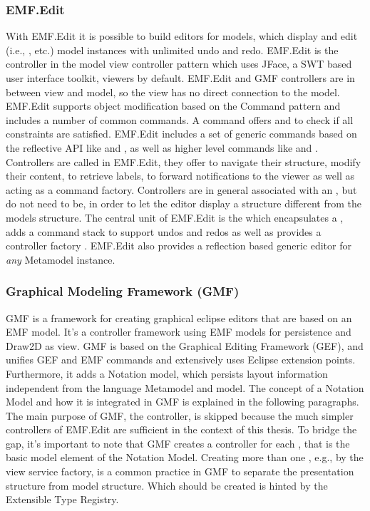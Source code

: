 \subsubsection{EMF.Edit}
With EMF.Edit it is possible to build editors for models, which display and edit (i.e., , etc.) model instances with unlimited undo and redo. EMF.Edit is the controller in the model view controller pattern which uses JFace, a SWT based user interface toolkit, viewers by default. EMF.Edit and GMF controllers are in between view and model, so the view has no direct connection to the model. EMF.Edit supports object modification based on the Command pattern \cite{patterns} and includes a number of common commands. A command offers  and  to check if all constraints are satisfied.  EMF.Edit includes a set of generic commands based on the reflective API like  and , as well as  higher level commands like  and . Controllers are called  in EMF.Edit, they offer to navigate their structure, modify their content, to retrieve labels, to forward notifications to the viewer as well as acting as a command factory. Controllers are in general associated with an , but do not need to be, in order to let the editor display a structure different from the models structure. The central unit of EMF.Edit is the  which encapsulates a , adds a command stack to support undos and redos as well as provides a controller factory \cite{EMF2nd}. EMF.Edit also provides a reflection based generic editor for \emph{any} Metamodel instance.  


\subsubsection {Graphical Modeling Framework (GMF)}
GMF is a framework for creating graphical eclipse editors that are based on an EMF model. It's a controller framework using EMF models for persistence and Draw2D as view. GMF is based on the Graphical Editing Framework (GEF), and unifies GEF and EMF commands and extensively uses Eclipse extension points. Furthermore, it adds a Notation model, which persists layout information independent from the language Metamodel and model. The concept of a Notation Model and how it is integrated in GMF is explained in the following paragraphs. The main purpose of GMF, the controller, is skipped because the much simpler controllers of EMF.Edit are sufficient in the context of this thesis. To bridge the gap, it's important to note that GMF creates a controller for each , that is the basic model element of the Notation Model. Creating more than one , e.g., by the view service factory, is a common practice in GMF to separate the presentation structure from model structure. Which  should be created is hinted by the Extensible Type Registry.

